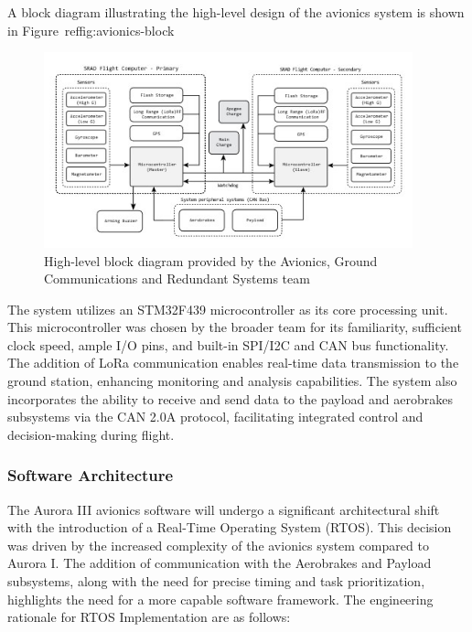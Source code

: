 A block diagram illustrating the high-level design of the avionics system is shown in Figure~ref{fig:avionics-block}

\begin{figure}[h]
  \begin{center}
    \includegraphics[width=0.95\textwidth]{./img/Section_4_1_A3_SRAD_design.jpg}
  \end{center}
  \caption{High-level block diagram provided by the Avionics, Ground Communications and Redundant Systems team}\label{fig:avionics-block}
\end{figure}


The system utilizes an STM32F439 microcontroller as its core processing unit. This microcontroller was chosen by the broader team for its familiarity, sufficient clock speed, ample I/O pins, and built-in SPI/I2C and CAN bus functionality. The addition of LoRa communication enables real-time data transmission to the ground station, enhancing monitoring and analysis capabilities. The system also incorporates the ability to receive and send data to the payload and aerobrakes subsystems via the CAN 2.0A protocol, facilitating integrated control and decision-making during flight. 

\subsubsection{Software Architecture}
The Aurora III avionics software will undergo a significant architectural shift with the introduction of a Real-Time Operating System (RTOS). This decision was driven by the increased complexity of the avionics system compared to Aurora I. The addition of communication with the Aerobrakes and Payload subsystems, along with the need for precise timing and task prioritization, highlights the need for a more capable software framework. The engineering rationale for RTOS Implementation are as follows:  

